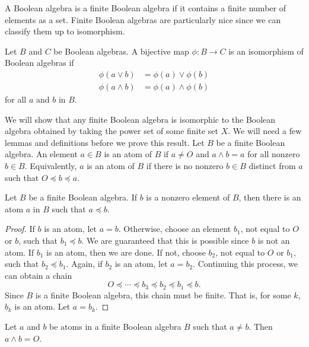  
A Boolean algebra is a {\bfi finite Boolean algebra\/} if it contains a finite number of elements as a set.
Finite Boolean algebras are particularly nice since we can classify
them  up to isomorphism.   
 
 
Let $B$ and $C$ be Boolean algebras.  A bijective map $\phi : B
\rightarrow C$ is an {\bfi isomorphism\/} of Boolean
algebras  if 
\begin{align*}
\phi( a \vee b )  & = \phi(a) \vee \phi(b) \\
\phi( a \wedge b )  & = \phi(a) \wedge \phi(b)
\end{align*}
for all $a$ and $b$ in $B$. 
 
 
We will show that any finite Boolean algebra is isomorphic to the 
Boolean algebra obtained by taking the power set of some finite set 
$X$. We will need a few lemmas and definitions before we prove this result.
Let $B$ be a finite Boolean algebra. An element $a \in B$ is  an {\bfi
atom\/} of $B$ if $a \neq
O$ and $a \wedge b = a$ for all nonzero $b \in B$. Equivalently, $a$ is an
atom of $B$ if there is no nonzero $b \in B$ distinct from $a$ such
that $O \preceq b \preceq a$. 
 
 
\begin{lemma}
Let $B$ be a finite Boolean algebra. If $b$ is a nonzero element of
$B$, then there is an atom $a$ in $B$ such that $a \preceq b$.
\end{lemma}
 
 
\begin{proof}
If $b$ is an atom, let $a =b$. Otherwise, choose an element $b_1$, not
equal to $O$ or $b$, such that $b_1 \preceq b$. We are guaranteed that
this is possible since $b$ is not an atom. If $b_1$ is an atom, then
we are done.  If not, choose $b_2$, not equal to $O$ or $b_1$, such that 
$b_2 \preceq b_1$. Again, if $b_2$ is an atom, let $a = b_2$.
Continuing this process, we can obtain a chain
\[
O \preceq \cdots \preceq b_3 \preceq b_2 \preceq b_1 \preceq b.
\]
Since $B$ is a finite Boolean algebra, this chain must be finite.  That
is, for some $k$, $b_k$ is an atom. Let $a = b_k$.
\end{proof}
 
 
\begin{lemma}\label{boolean:zero_vee_lemma}
Let $a$ and $b$ be atoms in a finite Boolean algebra $B$ such that $a
\neq b$. Then $a \wedge b = O$.
\end{lemma}
 
